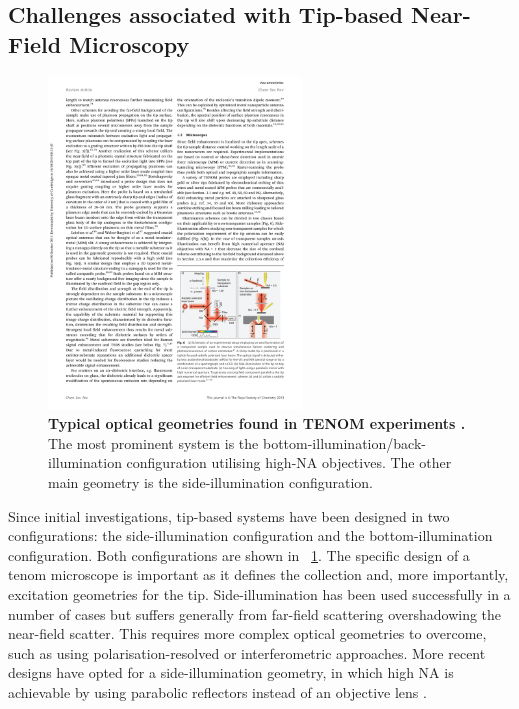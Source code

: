 \documentclass{article}
\begin{document}

\subsection{Challenges associated with Tip-based Near-Field Microscopy}

\begin{figure}[bt]
\centering
\includegraphics[width=0.6\textwidth]{figures/literature/mauser2014a}
\caption[Typical optical geometries found in TENOM experiments \cite{mauser2014}]{\textbf{Typical optical geometries found in TENOM experiments \cite{mauser2014}.} The most prominent system is the bottom-illumination/back-illumination configuration utilising high-NA objectives. The other main geometry is the side-illumination configuration.}
\label{fig:ters_geometries}
\end{figure}

Since initial investigations, tip-based systems have been designed in two configurations: the side-illumination configuration and the bottom-illumination configuration. Both configurations are shown in \figurename~\ref{fig:ters_geometries}. The specific design of a \gls{tenom} microscope is important as it defines the collection and, more importantly, excitation geometries for the tip. Side-illumination has been used successfully in a number of cases \cite{mehtani2006, zhang2013, wickramasinghe2014} but suffers generally from far-field scattering overshadowing the near-field scatter. This requires more complex optical geometries to overcome, such as using polarisation-resolved or interferometric approaches. More recent designs have opted for a side-illumination geometry, in which high NA is achievable by using parabolic reflectors instead of an objective lens \cite{steidtner2007}.
\end{document}
